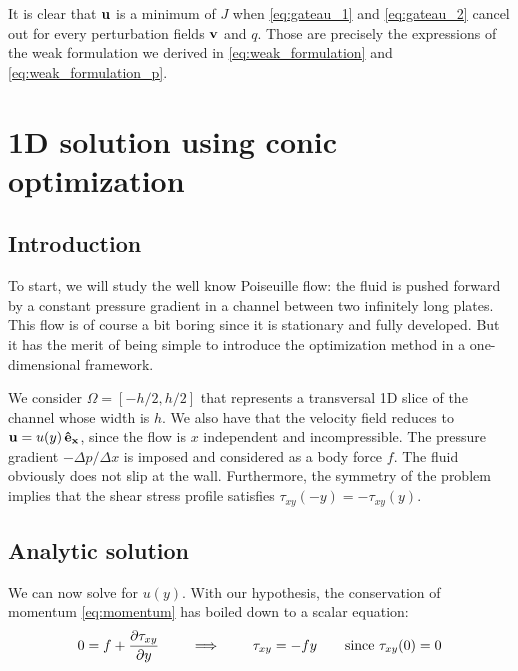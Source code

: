 \documentclass[11 pt]{report}
\begin{document}
It is clear that $\mathbf{u}$ is a minimum of $J$ when \eqref{eq:gateau_1} and \eqref{eq:gateau_2} cancel out for every perturbation fields $\mathbf{v}$ and $q$. Those are precisely the expressions of the weak formulation we derived in \eqref{eq:weak_formulation} and \eqref{eq:weak_formulation_p}.


\chapter{1D solution using conic optimization}
\label{chap:chap1D}

\section{Introduction}
To start, we will study the well know Poiseuille flow: the fluid is pushed forward by a constant pressure gradient in a channel between two infinitely long plates. This flow is of course a bit boring since it is stationary and fully developed. But it has the merit of being simple to introduce the optimization method in a one-dimensional framework.

We consider $\Omega = [-h/2, h/2]$ that represents a transversal 1D slice of the channel whose width is $h$. We also have that the velocity field reduces to $\mathbf{u} = u(y)\,\mathbf{\hat{e}_x}$, since the flow is $x$ independent and incompressible. The pressure gradient $-\Delta p/\Delta x$ is imposed and considered as a body force $f$. The fluid obviously does not slip at the wall. Furthermore, the symmetry of the problem implies that the shear stress profile satisfies $\tau_{xy}(-y) = -\tau_{xy}(y)$.


\section{Analytic solution}
\label{sec:analytic1D}
We can now solve for $u(y)$. With our hypothesis, the conservation of momentum \eqref{eq:momentum} has boiled down to a scalar equation:
\begin{align}
    0 = f + \pdv{\tau_{xy}}{y} \qquad \implies \qquad \tau_{xy} = -f y \qquad \text{since } \tau_{xy}(0)=0
    \label{eq:tau_xy}
\end{align}
\end{document}
